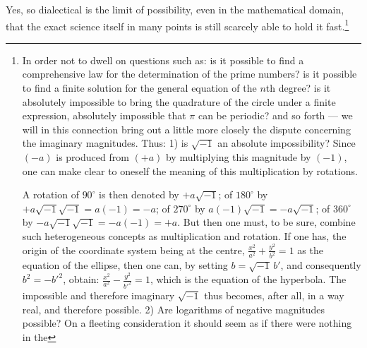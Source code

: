 \documentclass[12pt]{book}
\begin{document}
Yes, so dialectical is the limit of possibility, even in the mathematical domain,
that the exact science itself in many points is still scarcely able to hold it
fast.\footnote{In order not to dwell on questions such as: is it possible to find a
comprehensive law for the determination of the prime numbers? is it possible to find
a finite solution for the general equation of the $n$th degree? is it absolutely
impossible to bring the quadrature of the circle under a finite expression,
absolutely impossible that $\pi$ can be periodic? and so forth --- we will in this
connection bring out a little more closely the dispute concerning the imaginary
magnitudes. Thus: 1) is $\sqrt{-1}$ an absolute impossibility? Since $(-a)$ is
produced from $(+a)$ by multiplying this magnitude by $(-1)$, one can make clear to
oneself the meaning of this multiplication by rotations.
\begin{center}
\end{center}
A rotation of $90^{\circ}$ is then denoted by $+a\sqrt{-1}$; of $180^{\circ}$
by $+a\sqrt{-1}\sqrt{-1} = a(-1) = -a$; of $270^{\circ}$ by
$a(-1)\sqrt{-1} = -a\sqrt{-1}$; of $360^{\circ}$ by
$-a\sqrt{-1}\sqrt{-1} = -a(-1) = +a$. But then one must, to be sure, combine such
heterogeneous concepts as multiplication and rotation. If one has, the origin of the
coordinate system being at the centre,
$\frac{x^{2}}{a^{2}} + \frac{y^{2}}{b^{2}} = 1$ as the equation of the ellipse, then
one can, by setting $b = \sqrt{-1}\,b'$, and consequently $b^{2} = -{b'}^{2}$, obtain:
$\frac{x^{2}}{a^{2}} - \frac{y^{2}}{{b'}^{2}} = 1$, which is the equation of the
hyperbola. The impossible and therefore imaginary $\sqrt{-1}$ thus becomes, after
all, in a way real, and therefore possible. 2) Are logarithms of negative magnitudes
possible? On a fleeting consideration it should seem as if there were nothing in the
}
\end{document}
